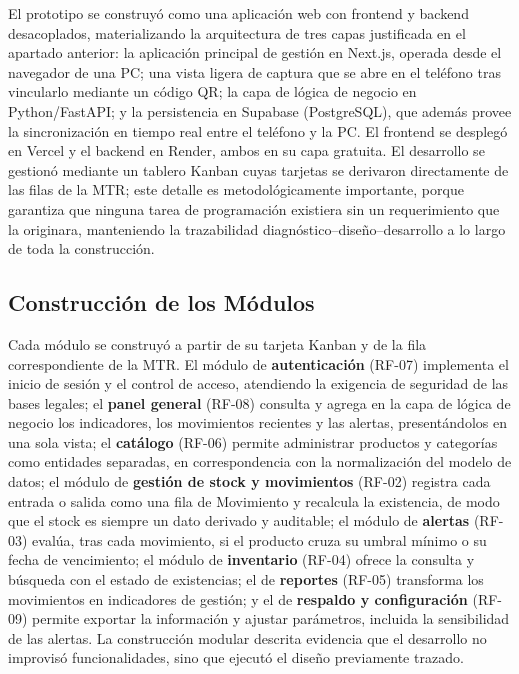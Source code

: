 \documentclass[12pt, letterpaper]{report}
\begin{document}
El prototipo se construyó como una aplicación web con frontend y
backend desacoplados, materializando la arquitectura de tres capas
justificada en el apartado anterior: la aplicación principal de gestión
en Next.js, operada desde el navegador de una PC; una vista ligera de
captura que se abre en el teléfono tras vincularlo mediante un código
QR; la capa de lógica de negocio en Python/FastAPI; y la persistencia
en Supabase (PostgreSQL), que además provee la sincronización en tiempo
real entre el teléfono y la PC. El frontend se desplegó en Vercel y el
backend en Render, ambos en su capa gratuita. El desarrollo se gestionó
mediante un tablero Kanban cuyas tarjetas se derivaron directamente de
las filas de la MTR; este detalle es metodológicamente importante,
porque garantiza que ninguna tarea de programación existiera sin un
requerimiento que la originara, manteniendo la trazabilidad
diagnóstico--diseño--desarrollo a lo largo de toda la construcción.

\subsection{Construcción de los Módulos}

Cada módulo se construyó a partir de su tarjeta Kanban y de la fila
correspondiente de la MTR. El módulo de \textbf{autenticación} (RF-07)
implementa el inicio de sesión y el control de acceso, atendiendo la
exigencia de seguridad de las bases legales; el \textbf{panel general}
(RF-08) consulta y agrega en la capa de lógica de negocio los
indicadores, los movimientos recientes y las alertas, presentándolos en
una sola vista; el \textbf{catálogo} (RF-06) permite administrar
productos y categorías como entidades separadas, en correspondencia con
la normalización del modelo de datos; el módulo de \textbf{gestión de
stock y movimientos} (RF-02) registra cada entrada o salida como una
fila de Movimiento y recalcula la existencia, de modo que el stock es
siempre un dato derivado y auditable; el módulo de \textbf{alertas}
(RF-03) evalúa, tras cada movimiento, si el producto cruza su umbral
mínimo o su fecha de vencimiento; el módulo de \textbf{inventario}
(RF-04) ofrece la consulta y búsqueda con el estado de existencias; el
de \textbf{reportes} (RF-05) transforma los movimientos en indicadores
de gestión; y el de \textbf{respaldo y configuración} (RF-09) permite
exportar la información y ajustar parámetros, incluida la sensibilidad
de las alertas. La construcción modular descrita evidencia que el
desarrollo no improvisó funcionalidades, sino que ejecutó el diseño
previamente trazado.
\end{document}
